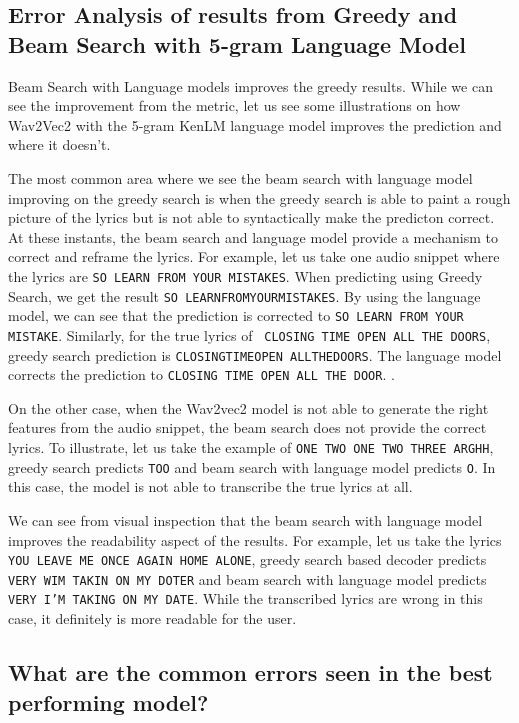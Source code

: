 \subsection{\textbf{ Error Analysis of results from Greedy and Beam Search with 5-gram Language Model}}

Beam Search with Language models improves the greedy results. While we can see the improvement from the metric, let us see some illustrations on how Wav2Vec2 with the 5-gram KenLM language model improves the prediction and where it doesn't.

The most common area where we see the beam search with language model improving on the greedy search is when the greedy search is able to paint a rough picture of the lyrics but is not able to syntactically make the predicton correct. At these instants, the beam search and language model provide a mechanism to correct and reframe the lyrics. For example, let us take one audio snippet where the lyrics are \texttt{SO LEARN FROM YOUR MISTAKES}. When predicting using Greedy Search, we get the result \texttt{SO LEARNFROMYOURMISTAKES}. By using the language model, we can see that the prediction is corrected to \texttt{SO LEARN FROM YOUR MISTAKE}. Similarly, for the true lyrics of \texttt{ CLOSING TIME OPEN ALL THE DOORS}, greedy search prediction is \texttt{CLOSINGTIMEOPEN ALLTHEDOORS}. The language model corrects the prediction to \texttt{CLOSING TIME OPEN ALL THE DOOR}. .

On the other case, when the Wav2vec2 model is not able to generate the right features from the audio snippet, the beam search does not provide the correct lyrics. To illustrate, let us take the example of \texttt{ONE TWO ONE TWO THREE ARGHH}, greedy search predicts \texttt{TOO} and beam search with language model predicts \texttt{O}. In this case, the model is not able to transcribe the true lyrics at all.

We can see from visual inspection that the beam search with language model improves the readability aspect of the results. For example, let us take the lyrics \texttt{YOU LEAVE ME ONCE AGAIN HOME ALONE}, greedy search based decoder predicts \texttt{VERY WIM TAKIN ON MY DOTER} and beam search with language model predicts \texttt{VERY I'M TAKING ON MY DATE}. While the transcribed lyrics are wrong in this case, it definitely is more readable for the user.
    
\subsection{\textbf{What are the common errors seen in the best performing model?}}

